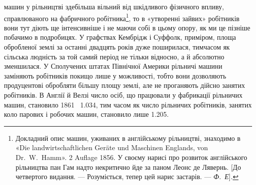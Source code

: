 \parcont{}  %
машин у рільництві здебільша вільний від шкідливого фізичного
впливу, справлюваного на фабричного робітника\footnote{
Докладний опис машин, уживаних в англійському рільництві,
знаходимо в «\textgerman{Die landwirtschaftlichen Geräte und Maschinen Englands,
von Dr.~W.~Hamm}». 2 Auflage 1856. У своєму нарисі про розвиток англійського
рільництва пан Гам надто некритично йде за паном Леонс де
Лявернь. [До четвертого видання. — Розуміється, тепер цей нарис застарів.
— \emph{Ф.~Е}].
},
то в «утворенні зайвих» робітників вони тут діють ще інтенсивніше
і не маючи собі в цьому опору, як ми це пізніше
побачимо в подробицях. У графствах Кембрідж і Суффолк, приміром,
площа обробленої землі за останні двадцять років дуже
поширилася, тимчасом як сільська людність за той самий період
не тільки відносно, а й абсолютно зменшилася. У Сполучених
штатах Північної Америки рільничі машини заміняють робітників
покищо лише у можливості, тобто вони дозволяють продуцентові
обробляти більшу площу землі, але не проганяють дійсно
занятих робітників. В Англії й Велзі число осіб, що працювали
у фабрикації рільничих машин, становило 1861~ \num{1.034}, тим часом
як число рільничих робітників, занятих коло парових і робочих
машин, становило лише \num{1.205}.

